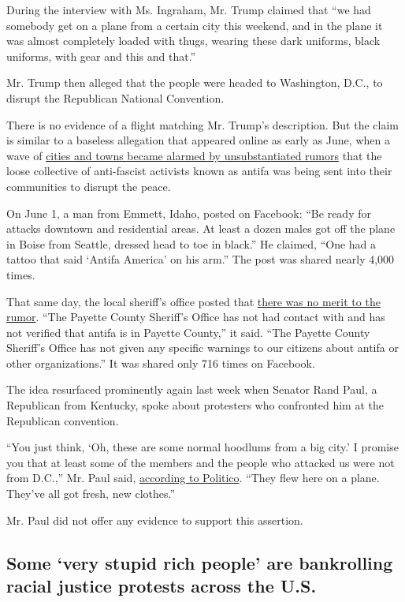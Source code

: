 During the interview with Ms. Ingraham, Mr. Trump claimed that ``we had
somebody get on a plane from a certain city this weekend, and in the
plane it was almost completely loaded with thugs, wearing these dark
uniforms, black uniforms, with gear and this and that.''

Mr. Trump then alleged that the people were headed to Washington, D.C.,
to disrupt the Republican National Convention.

There is no evidence of a flight matching Mr. Trump's description. But
the claim is similar to a baseless allegation that appeared online as
early as June, when a wave of
\href{https://www.nytimes3xbfgragh.onion/2020/06/22/technology/antifa-local-disinformation.html}{cities
and towns became alarmed by unsubstantiated rumors} that the loose
collective of anti-fascist activists known as antifa was being sent into
their communities to disrupt the peace.

On June 1, a man from Emmett, Idaho, posted on Facebook: ``Be ready for
attacks downtown and residential areas. At least a dozen males got off
the plane in Boise from Seattle, dressed head to toe in black.'' He
claimed, ``One had a tattoo that said `Antifa America' on his arm.'' The
post was shared nearly 4,000 times.

That same day, the local sheriff's office posted that
\href{https://www.facebookcorewwwi.onion/1201021953344520/posts/3001368046643226}{there
was no merit to the rumor}. ``The Payette County Sheriff's Office has
not had contact with and has not verified that antifa is in Payette
County,'' it said. ``The Payette County Sheriff's Office has not given
any specific warnings to our citizens about antifa or other
organizations.'' It was shared only 716 times on Facebook.

The idea resurfaced prominently again last week when Senator Rand Paul,
a Republican from Kentucky, spoke about protesters who confronted him at
the Republican convention.

``You just think, `Oh, these are some normal hoodlums from a big city.'
I promise you that at least some of the members and the people who
attacked us were not from D.C.,'' Mr. Paul said,
\href{https://www.politico.com/news/2020/08/28/protesters-confront-rand-paul-rnc-404223}{according
to Politico}. ``They flew here on a plane. They've all got fresh, new
clothes.''

Mr. Paul did not offer any evidence to support this assertion.

\hypertarget{some-very-stupid-rich-people-are-bankrolling-racial-justice-protests-across-the-us}{%
\subsection{Some `very stupid rich people' are bankrolling racial
justice protests across the
U.S.}\label{some-very-stupid-rich-people-are-bankrolling-racial-justice-protests-across-the-us}}

